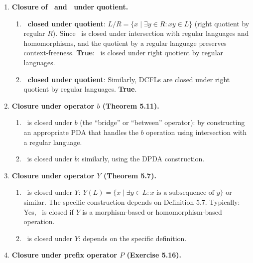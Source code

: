 \begin{enumerate}[{10.}1. ]
\item \textbf{Closure of \PSIG\ and \ASIG\ under quotient.}

\begin{enumerate}
\item \textbf{\PSIG\ closed under quotient}: $L/R = \{x \mid \exists y\in R: xy\in L\}$ (right quotient by regular $R$). Since \PSIG\ is closed under intersection with regular languages and homomorphisms, and the quotient by a regular language preserves context-freeness. \textbf{True}: \PSIG\ is closed under right quotient by regular languages.

\item \textbf{\ASIG\ closed under quotient}: Similarly, DCFLs are closed under right quotient by regular languages. \textbf{True}.
\end{enumerate}

\item \textbf{Closure under operator $b$ (Theorem 5.11).}

\begin{enumerate}
\item \PSIG\ is closed under $b$ (the ``bridge'' or ``between'' operator): by constructing an appropriate PDA that handles the $b$ operation using intersection with a regular language.

\item \ASIG\ is closed under $b$: similarly, using the DPDA construction.
\end{enumerate}

\item \textbf{Closure under operator $Y$ (Theorem 5.7).}

\begin{enumerate}
\item \PSIG\ is closed under $Y$: $Y(L) = \{x \mid \exists y\in L: x \text{ is a subsequence of } y\}$ or similar. The specific construction depends on Definition 5.7. Typically: Yes, \PSIG\ is closed if $Y$ is a morphism-based or homomorphism-based operation.

\item \ASIG\ is closed under $Y$: depends on the specific definition.
\end{enumerate}

\item \textbf{Closure under prefix operator $P$ (Exercise 5.16).}


\end{enumerate}
